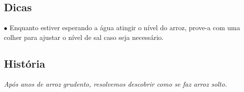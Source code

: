 \begin{aemulticol}[width=0.495\textwidth,height=0.545\textheight]
	\vspace*{-0.15cm}
	\subsection*{\subsectionformat Dicas}
	\vspace*{-0.15cm}
	$\bullet$ Enquanto estiver esperando a água atingir o nível do arroz, prove-a com uma colher para ajustar o nível de sal caso seja necessário.
	
	\vspace*{-0.15cm}
	\subsection*{\subsectionformat História}
	\vspace*{-0.15cm}
	\textit{Após anos de arroz grudento, resolvemos descobrir como se faz arroz solto.}	
\end{aemulticol}
